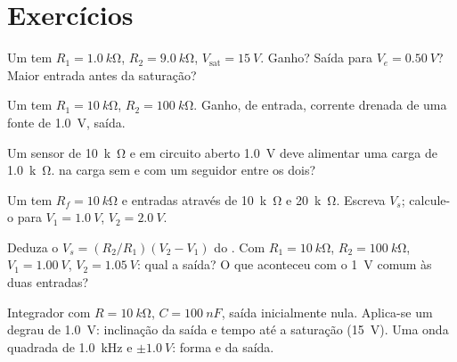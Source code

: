 \section{Exercícios}

\begin{exercise}[$\star$]\label{exo:b1:operational-amplifier:1}
Um  tem $R_1 = \qty{1.0}{k\ohm}$, $R_2 =
\qty{9.0}{k\ohm}$, $V_{\mathrm{sat}} = \qty{15}{V}$. Ganho? Saída para
$V_e = \qty{0.50}{V}$? Maior entrada antes da saturação?
\end{exercise}

\begin{exercise}[$\star$]\label{exo:b1:operational-amplifier:2}
Um  tem $R_1 = \qty{10}{k\ohm}$, $R_2 = \qty{100}{k\ohm}$.
Ganho,  de entrada, corrente drenada de uma fonte de \qty{1.0}{V}, saída.
\end{exercise}

\begin{exercise}[$\star$]\label{exo:b1:operational-amplifier:3}
Um sensor de  \qty{10}{k\ohm} e  em circuito
aberto \qty{1.0}{V} deve alimentar uma carga de \qty{1.0}{k\ohm}.  na
carga sem e com um seguidor entre os dois?
\end{exercise}

\begin{exercise}[$\star$]\label{exo:b1:operational-amplifier:4}
Um  tem $R_f = \qty{10}{k\ohm}$ e entradas através de
\qty{10}{k\ohm} e \qty{20}{k\ohm}. Escreva $V_s$; calcule-o para
$V_1 = \qty{1.0}{V}$, $V_2 = \qty{2.0}{V}$.
\end{exercise}

\begin{exercise}[$\star\star$]\label{exo:b1:operational-amplifier:5}
Deduza o $V_s = (R_2/R_1)(V_2 - V_1)$ do . Com
$R_1 = \qty{10}{k\ohm}$, $R_2 = \qty{100}{k\ohm}$, $V_1 = \qty{1.00}{V}$,
$V_2 = \qty{1.05}{V}$: qual a saída? O que aconteceu com o \qty{1}{V} comum
às duas entradas?
\end{exercise}

\begin{exercise}[$\star\star$]\label{exo:b1:operational-amplifier:6}
Integrador com $R = \qty{10}{k\ohm}$, $C = \qty{100}{nF}$, saída
inicialmente nula. Aplica-se um degrau de \qty{1.0}{V}: inclinação da saída e
tempo até a saturação (\qty{15}{V}). Uma onda quadrada de \qty{1.0}{kHz} e
$\pm\qty{1.0}{V}$: forma e  da saída.
\end{exercise}

